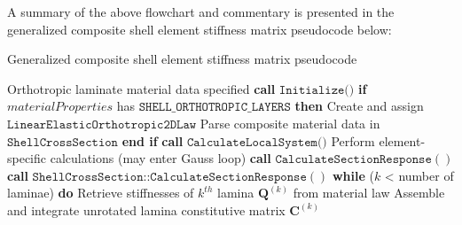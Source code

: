 A summary of the above flowchart and commentary is presented in the generalized composite shell element stiffness matrix pseudocode below:

\begin{algorithm}
	\onehalfspacing
	\caption{Generalized composite shell element stiffness matrix pseudocode}\label{general composite shell pseudocode}
	\begin{algorithmic}[1]
		\Require Orthotropic laminate material data specified
		\State \textbf{call} $\texttt{Initialize()}$
		\State \hspace{\algorithmicindent}\textbf{if} $materialProperties$ has $\texttt{SHELL\_ORTHOTROPIC\_LAYERS}$ \textbf{then}
		\State \hspace{\algorithmicindent} \hspace{\algorithmicindent} Create and assign $\texttt{LinearElasticOrthotropic2DLaw}$
		\State \hspace{\algorithmicindent} \hspace{\algorithmicindent} Parse composite material data in $\texttt{ShellCrossSection}$
		\State \hspace{\algorithmicindent}\textbf{end if}
		\State \textbf{call} $\texttt{CalculateLocalSystem()}$
		\State \hspace{\algorithmicindent}Perform element-specific calculations (may enter Gauss loop)
		\State \hspace{\algorithmicindent}\textbf{call} $\texttt{CalculateSectionResponse}()$
		\State \hspace{\algorithmicindent}\hspace{\algorithmicindent} \textbf{call} $\texttt{ShellCrossSection::CalculateSectionResponse}()$
		\State \hspace{\algorithmicindent} \hspace{\algorithmicindent} \hspace{\algorithmicindent} \textbf{while} ($k$ < number of laminae) \textbf{do}
		\State \hspace{\algorithmicindent} \hspace{\algorithmicindent} \hspace{\algorithmicindent} \hspace{\algorithmicindent}Retrieve stiffnesses of $k^{th}$ lamina $\mathbf{Q}^{(k)}$ from material law
		\State \hspace{\algorithmicindent} \hspace{\algorithmicindent} \hspace{\algorithmicindent} \hspace{\algorithmicindent}Assemble and integrate unrotated lamina constitutive matrix $\mathbf{C}^{(k)}$

\end{algorithmic}
\end{algorithm}
